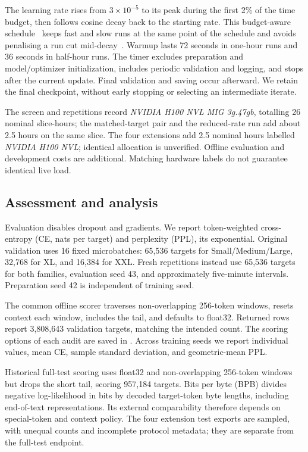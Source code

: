 \documentclass[10pt,twocolumn,letterpaper]{article}
\begin{document}
The learning rate rises from $3\times10^{-5}$ to its peak during the first 2\%
of the time budget, then follows cosine decay back to the starting rate. This
budget-aware schedule~\citep{li2020budgeted} keeps fast and slow runs at the same point
of the schedule and avoids penalising a run cut mid-decay~\citep{hagele2024}.
Warmup lasts 72 seconds in one-hour runs and 36 seconds in half-hour runs.
The timer excludes preparation and model/optimizer initialization, includes
periodic validation and logging, and stops after the current update. Final
validation and saving occur afterward. We retain the final checkpoint, without
early stopping or selecting an intermediate iterate.

The screen and repetitions record \emph{NVIDIA H100 NVL MIG 3g.47gb}, totalling
26 nominal slice-hours; the matched-target pair and the reduced-rate run add about 2.5
hours on the same slice. The four extensions add 2.5 nominal hours labelled
\emph{NVIDIA H100 NVL}; identical allocation is unverified. Offline evaluation
and development costs are additional. Matching hardware labels do not guarantee
identical live load.

\subsection{Assessment and analysis}

Evaluation disables dropout and gradients. We report token-weighted
cross-entropy (CE, nats per target) and perplexity (PPL), its exponential.
Original validation uses 16 fixed microbatches: 65,536 targets for
Small/Medium/Large, 32,768 for XL, and 16,384 for XXL. Fresh repetitions instead
use 65,536 targets for both families, evaluation seed 43, and approximately
five-minute intervals. Preparation seed 42 is independent of training seed.

The common offline scorer traverses non-overlapping 256-token windows, resets
context each window, includes the tail, and defaults to float32. Returned rows
report 3,808,643 validation targets, matching the intended count. The scoring
options of each audit are saved in .
Across training seeds we report individual values, mean CE, sample standard
deviation, and geometric-mean PPL.

Historical full-test scoring uses float32 and non-overlapping 256-token windows
but drops the short tail, scoring 957,184 targets. Bits per byte (BPB) divides
negative log-likelihood in bits by decoded target-token byte lengths, including
end-of-text representations. Its external comparability therefore depends on
special-token and context policy. The four extension test exports are sampled,
with unequal counts and incomplete protocol metadata; they are separate from
the full-test endpoint.
\end{document}
